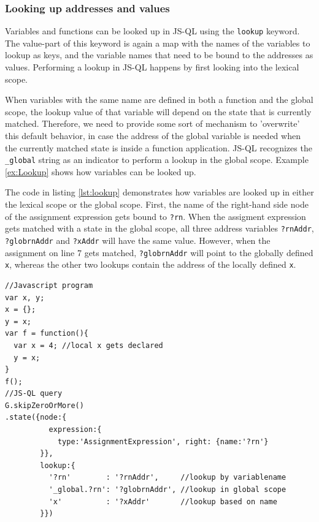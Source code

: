 \subsubsection*{Looking up addresses and values}
Variables and functions can be looked up in JS-QL using the \texttt{lookup} keyword. The value-part of this keyword is again a map with the names of the variables to lookup as keys, and the variable names that need to be bound to the addresses as values. Performing a lookup in JS-QL happens by first looking into the lexical scope. 

\noindent When variables with the same name are defined in both a function and the global scope, the lookup value of that variable will depend on the state that is currently matched. Therefore, we need to provide some sort of mechanism to 'overwrite' this default behavior, in case the address of the global variable is needed when the currently matched state is inside a function application. JS-QL recognizes the \texttt{\_global} string as an indicator to perform a lookup in the global scope. Example \ref{ex:Lookup} shows how variables can be looked up. 

\begin{exmp}
\label{ex:Lookup}
The code in listing \ref{lst:lookup} demonstrates how variables are looked up in either the lexical scope or the global scope.
First, the name of the right-hand side node of the assignment expression gets bound to \texttt{?rn}. When the assigment expression gets matched with a state in the global scope, all three address variables \texttt{?rnAddr}, \texttt{?globrnAddr} and \texttt{?xAddr} will have the same value. However, when the assignment on line 7 gets matched, \texttt{?globrnAddr} will point to the globally defined \texttt{x}, whereas the other two lookups contain the address of the locally defined \texttt{x}.

\begin{lstlisting}[label={lst:lookup},language=JSQL, caption=Looking up addresses in JS-QL,mathescape=true]
//Javascript program
var x, y;
x = {};
y = x;
var f = function(){
  var x = 4; //local x gets declared
  y = x;
}
f();
//JS-QL query
G.skipZeroOrMore()
.state({node:{
          expression:{
            type:'AssignmentExpression', right: {name:'?rn'}
        }},
        lookup:{
          '?rn'        : '?rnAddr',     //lookup by variablename
          '_global.?rn': '?globrnAddr', //lookup in global scope
          'x'          : '?xAddr'       //lookup based on name
        }})
\end{lstlisting}
\end{exmp}

